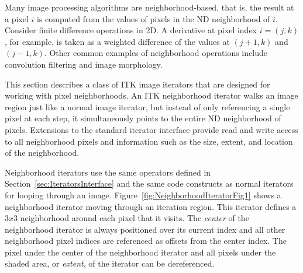 Many image processing algorithms are neighborhood-based, that is, the result at
a pixel $i$ is computed from the values of pixels in the ND neighborhood of
$i$. Consider finite difference operations in 2D.  A derivative at pixel index
$i = (j, k)$, for example, is taken as a weighted difference of the values
at $(j+1, k)$ and $(j-1, k)$. Other common examples of neighborhood operations
include convolution filtering and image morphology.

This section describes a class of ITK image iterators that are designed for
working with pixel neighborhoods. An ITK neighborhood iterator walks an image
region just like a normal image iterator, but instead of only referencing a
single pixel at each step, it simultaneously points to the entire ND
neighborhood of pixels.  Extensions to the standard iterator interface provide
read and write access to all neighborhood pixels and information
such as the size, extent, and location of the neighborhood.

Neighborhood iterators use the same operators defined in
Section~\ref{sec:IteratorsInterface} and the same code constructs as normal
iterators for looping through an
image. Figure~\ref{fig:NeighborhoodIteratorFig1} shows a neighborhood iterator
moving through an iteration region.  This iterator defines a $3x3$ neighborhood
around each pixel that it visits. The \emph{center} of the neighborhood
iterator is always positioned over its current index and all other neighborhood
pixel indices are referenced as offsets from the center index.  The pixel
under the center of the neighborhood iterator and all pixels under the shaded
area, or \emph{extent}, of the iterator can be dereferenced.





